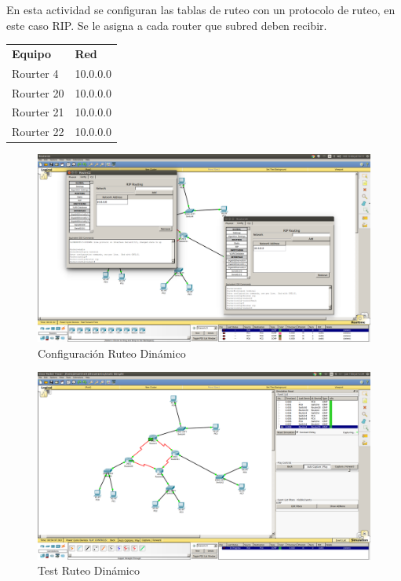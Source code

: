 \documentclass[spanish]{udpreport}
\begin{document}
En esta actividad se configuran las tablas de ruteo con un protocolo de ruteo, en este caso RIP. Se le asigna a cada router que subred deben recibir.
\begin{table}[H]
\centering
\begin{tabular}{p{3cm}|p{4cm}}
\textbf{Equipo} & \textbf{Red} \\
       Rourter 4 & 10.0.0.0\\
       Rourter 20 & 10.0.0.0\\
       Rourter 21 & 10.0.0.0\\
       Rourter 22 & 10.0.0.0\\
       
\end{tabular}
\end{table}
\begin{figure}[H]
	\centering
	\includegraphics[scale=.25]{imagenes/ruteo_dinamic.png}
	\caption{Configuración Ruteo Dinámico}
	\label{fig:Figura 4.1}
\end{figure}

\begin{figure}[H]
	\centering
	\includegraphics[scale=.25]{imagenes/test_rdinamic.png}
	\caption{Test Ruteo Dinámico}
	\label{fig:Figura 4.2}
\end{figure}
\end{document}
